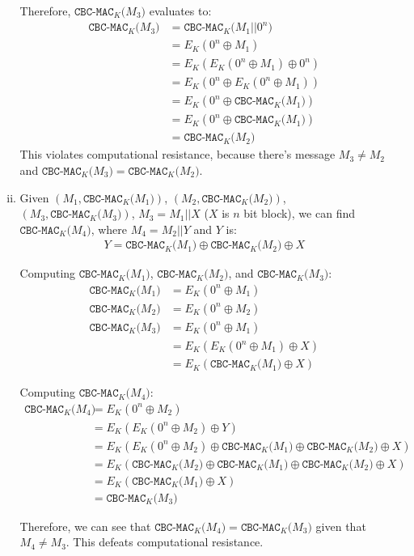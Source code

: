 \documentclass[11pt]{article}
\def\c#1{\texttt{#1}}
\def\cbcmac#1{\c{CBC-MAC}_K\c{(}#1\c{)}}
\theoremstyle{definition}
\begin{document}
\begin{enumerate}[a. ]
\begin{enumerate}[i. ]
          Therefore, $\cbcmac{M_3}$ evaluates to:
          \begin{align*}
            \cbcmac{M_3} &= \cbcmac{M_1||0^n} \\
                         &= E_K(0^n \oplus M_1) \\
                         &= E_K(E_K(0^n \oplus M_1) \oplus 0^n) \\
                         &= E_K(0^n \oplus E_K(0^n \oplus M_1)) \\
                         &= E_K(0^n \oplus \cbcmac{M_1}) \\
                         &= E_K(0^n \oplus \cbcmac{M_1}) \\
                         &= \cbcmac{M_2}
          \end{align*}
          This violates computational resistance, because there's message $M_3 \neq M_2$ and $\cbcmac{M_3} = \cbcmac{M_2}$.
      \item Given $(M_1, \cbcmac{M_1})$, $(M_2, \cbcmac{M_2})$, $(M_3, \cbcmac{M_3})$, $M_3 = M_1||X$ ($X$ is $n$ bit block), we can find $\cbcmac{M_4}$, where $M_4 = M_2||Y$ and $Y$ is:
        \begin{align*}
          Y = \cbcmac{M_1} \oplus \cbcmac{M_2} \oplus X
        \end{align*}

        Computing $\cbcmac{M_1}$, $\cbcmac{M_2}$, and $\cbcmac{M_3}$:
        \begin{align*}
          \cbcmac{M_1} &= E_K(0^n \oplus M_1) \\
          \cbcmac{M_2} &= E_K(0^n \oplus M_2) \\
          \cbcmac{M_3} &= E_K(0^n \oplus M_1) \\
                       &= E_K(E_K(0^n \oplus M_1) \oplus X) \\
                       &= E_K(\cbcmac{M_1} \oplus X)
        \end{align*}

        Computing $\cbcmac{M_4}$:
        \begin{align*}
          \cbcmac{M_4} &= E_K(0^n \oplus M_2) \\
                       &= E_K(E_K(0^n \oplus M_2) \oplus Y) \\
                       &= E_K(E_K(0^n \oplus M_2) \oplus \cbcmac{M_1} \oplus \cbcmac{M_2} \oplus X) \\
                       &= E_K(\cbcmac{M_2} \oplus \cbcmac{M_1} \oplus \cbcmac{M_2} \oplus X) \\
                       &= E_K(\cbcmac{M_1} \oplus X) \\
                       &= \cbcmac{M_3}
        \end{align*}

        Therefore, we can see that $\cbcmac{M_4} = \cbcmac{M_3}$ given that $M_4 \neq M_3$. This defeats computational resistance.
    \end{enumerate}
\end{enumerate}
\end{document}
